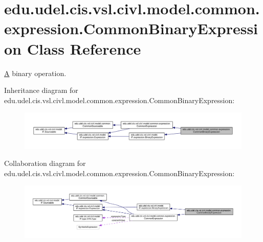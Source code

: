 \hypertarget{classedu_1_1udel_1_1cis_1_1vsl_1_1civl_1_1model_1_1common_1_1expression_1_1CommonBinaryExpression}{}\section{edu.\+udel.\+cis.\+vsl.\+civl.\+model.\+common.\+expression.\+Common\+Binary\+Expression Class Reference}
\label{classedu_1_1udel_1_1cis_1_1vsl_1_1civl_1_1model_1_1common_1_1expression_1_1CommonBinaryExpression}


\hyperlink{structA}{A} binary operation.  




Inheritance diagram for edu.\+udel.\+cis.\+vsl.\+civl.\+model.\+common.\+expression.\+Common\+Binary\+Expression\+:
\nopagebreak
\begin{figure}[H]
\begin{center}
\leavevmode
\includegraphics[width=350pt]{classedu_1_1udel_1_1cis_1_1vsl_1_1civl_1_1model_1_1common_1_1expression_1_1CommonBinaryExpression__inherit__graph}
\end{center}
\end{figure}


Collaboration diagram for edu.\+udel.\+cis.\+vsl.\+civl.\+model.\+common.\+expression.\+Common\+Binary\+Expression\+:
\nopagebreak
\begin{figure}[H]
\begin{center}
\leavevmode
\includegraphics[width=350pt]{classedu_1_1udel_1_1cis_1_1vsl_1_1civl_1_1model_1_1common_1_1expression_1_1CommonBinaryExpression__coll__graph}
\end{center}
\end{figure}
